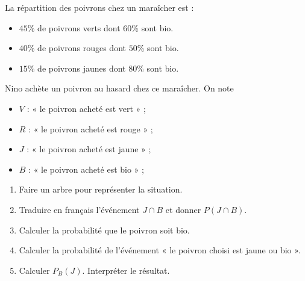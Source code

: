 \documentclass[11pt]{article}
\begin{document}
\begin{exo}[$6,5$ points]
  La répartition des poivrons chez un maraîcher est :
  \begin{itemize}
    \item $45$\% de poivrons verts dont $60$\% sont bio.
    \item $40$\% de poivrons rouges dont $50$\% sont bio.
    \item $15$\% de poivrons jaunes dont $80$\% sont bio.
  \end{itemize}
  Nino achète un poivron au hasard chez ce maraîcher.
  On note
  \begin{itemize}
    \item $V$ : « le poivron acheté est vert » ;
    \item $R$ : « le poivron acheté est rouge » ;
    \item $J$ : « le poivron acheté est jaune » ;
    \item $B$ : « le poivron acheté est bio » ;
  \end{itemize}
  \begin{enumerate}
    \item Faire un arbre pour représenter la situation.
    \item Traduire en français l'événement $J\cap B$ et donner $P(J\cap B)$.
    \item Calculer la probabilité que le poivron soit bio.
    \item Calculer la probabilité de l'événement « le poivron choisi est jaune
      ou bio ».
    \item Calculer $P_B(J)$. Interpréter le résultat.
  \end{enumerate}
\end{exo}
\end{document}
